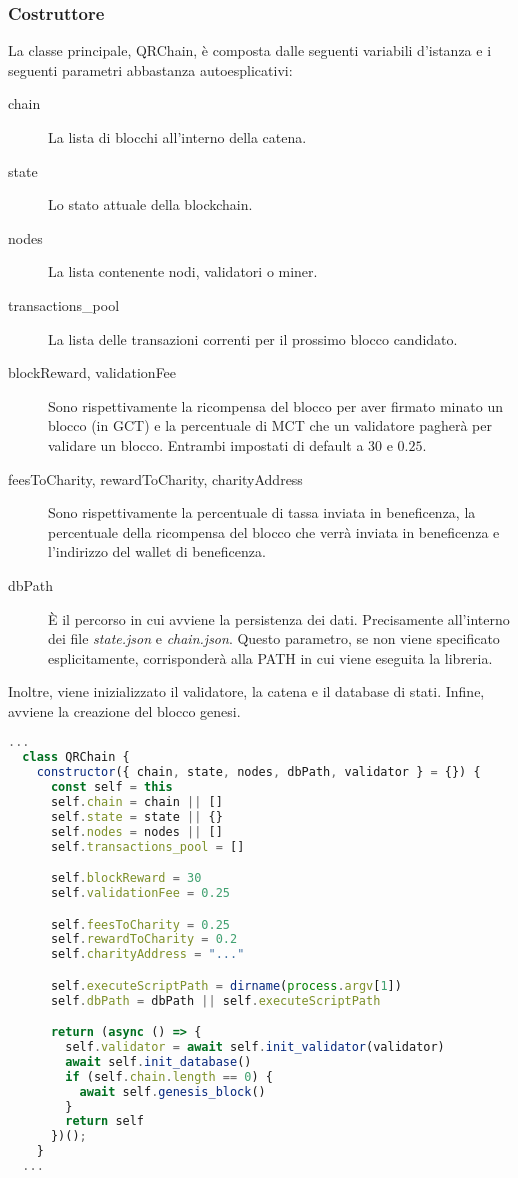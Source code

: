 \subsubsection{Costruttore}
La classe principale, QRChain, è composta dalle seguenti variabili d'istanza e i seguenti parametri abbastanza autoesplicativi:
\begin{description}
  \item[chain] La lista di blocchi all'interno della catena.
  \item[state] Lo stato attuale della blockchain.
  \item[nodes] La lista contenente nodi, validatori o miner.
  \item[transactions\_pool] La lista delle transazioni correnti per il prossimo blocco candidato.
  \item[blockReward, validationFee] Sono rispettivamente la ricompensa del blocco per aver firmato minato un blocco (in GCT) e la percentuale di MCT che un validatore pagherà per validare un blocco. Entrambi impostati di default a \(30\) e \(0.25\).
  \item[feesToCharity, rewardToCharity, charityAddress] Sono rispettivamente la percentuale di tassa inviata in beneficenza, la percentuale della ricompensa del blocco che verrà inviata in beneficenza e l'indirizzo del wallet di beneficenza.
  \item[dbPath] È il percorso in cui avviene la persistenza dei dati. Precisamente all'interno dei file \textit{state.json} e \textit{chain.json}. Questo parametro, se non viene specificato esplicitamente, corrisponderà alla PATH in cui viene eseguita la libreria.
\end{description}

Inoltre, viene inizializzato il validatore, la catena e il database di stati. Infine, avviene la creazione del blocco genesi.

\begin{lstlisting}[language=JavaScript,breaklines]
  ...
  class QRChain {
    constructor({ chain, state, nodes, dbPath, validator } = {}) {
      const self = this
      self.chain = chain || []
      self.state = state || {}
      self.nodes = nodes || [] 
      self.transactions_pool = []

      self.blockReward = 30
      self.validationFee = 0.25

      self.feesToCharity = 0.25
      self.rewardToCharity = 0.2
      self.charityAddress = "..." 

      self.executeScriptPath = dirname(process.argv[1])
      self.dbPath = dbPath || self.executeScriptPath 

      return (async () => {
        self.validator = await self.init_validator(validator)
        await self.init_database()
        if (self.chain.length == 0) {
          await self.genesis_block()
        }
        return self
      })();
    }
  ...
\end{lstlisting}

